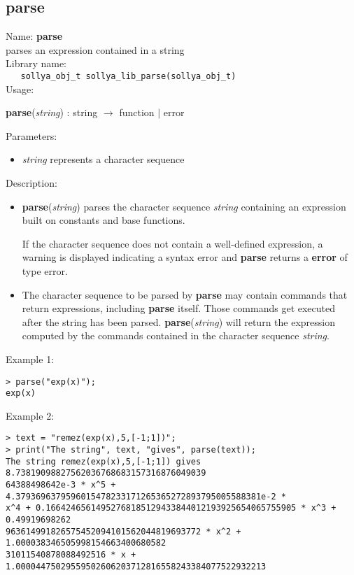 \subsection{parse}
\label{labparse}
\noindent Name: \textbf{parse}\\
\phantom{aaa}parses an expression contained in a string\\[0.2cm]
\noindent Library name:\\
\verb|   sollya_obj_t sollya_lib_parse(sollya_obj_t)|\\[0.2cm]
\noindent Usage: 
\begin{center}
\textbf{parse}(\emph{string}) : \textsf{string} $\rightarrow$ \textsf{function} $|$ \textsf{error}\\
\end{center}
Parameters: 
\begin{itemize}
\item \emph{string} represents a character sequence
\end{itemize}
\noindent Description: \begin{itemize}

\item \textbf{parse}(\emph{string}) parses the character sequence \emph{string} containing
   an expression built on constants and base functions.
    
   If the character sequence does not contain a well-defined expression,
   a warning is displayed indicating a syntax error and \textbf{parse} returns
   a \textbf{error} of type \textsf{error}.

\item The character sequence to be parsed by \textbf{parse} may contain commands that 
   return expressions, including \textbf{parse} itself. Those commands get executed after the string has been parsed.
   \textbf{parse}(\emph{string}) will return the expression computed by the commands contained in the character 
   sequence \emph{string}.
\end{itemize}
\noindent Example 1: 
\begin{center}\begin{minipage}{15cm}\begin{Verbatim}[frame=single]
> parse("exp(x)");
exp(x)
\end{Verbatim}
\end{minipage}\end{center}
\noindent Example 2: 
\begin{center}\begin{minipage}{15cm}\begin{Verbatim}[frame=single]
> text = "remez(exp(x),5,[-1;1])";
> print("The string", text, "gives", parse(text));
The string remez(exp(x),5,[-1;1]) gives 8.73819098827562036768683157316876049039
64388498642e-3 * x^5 + 4.3793696379596015478233171265365272893795005588381e-2 * 
x^4 + 0.16642465614952768185129433844012193925654065755905 * x^3 + 0.49919698262
963614991826575452094101562044819693772 * x^2 + 1.000038346505998154663400680582
31011540878088492516 * x + 1.00004475029559502606203712816558243384077522932213
\end{Verbatim}
\end{minipage}\end{center}
